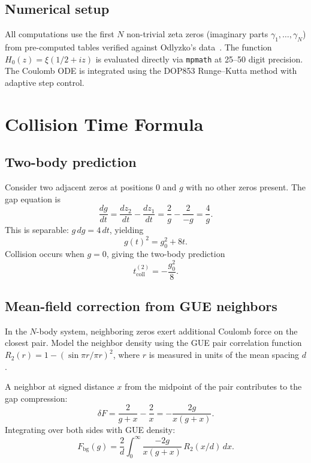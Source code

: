 \documentclass[11pt,a4paper]{article}
\begin{document}
\subsection{Numerical setup}

All computations use the first $N$ non-trivial zeta zeros (imaginary
parts $\gamma_1, \ldots, \gamma_N$) from pre-computed tables verified
against Odlyzko's data~\cite{odlyzko}. The function $H_0(z) =
\xi(1/2+iz)$ is evaluated directly via \texttt{mpmath} at 25--50
digit precision. The Coulomb ODE is integrated using the DOP853
Runge--Kutta method with adaptive step control.

\section{Collision Time Formula}\label{sec:collision}

\subsection{Two-body prediction}

Consider two adjacent zeros at positions $0$ and $g$ with no other
zeros present. The gap equation is
\[
  \frac{dg}{dt} = \frac{dz_2}{dt} - \frac{dz_1}{dt}
  = \frac{2}{g} - \frac{2}{-g} = \frac{4}{g}.
\]
This is separable: $g\,dg = 4\,dt$, yielding
\begin{equation}\label{eq:2body}
  g(t)^2 = g_0^2 + 8t.
\end{equation}
Collision occurs when $g = 0$, giving the two-body prediction
\begin{equation}\label{eq:t-2body}
  t_{\mathrm{coll}}^{(2)} = -\frac{g_0^2}{8}.
\end{equation}

\subsection{Mean-field correction from GUE neighbors}

In the $N$-body system, neighboring zeros exert additional Coulomb
force on the closest pair. Model the neighbor density using the GUE
pair correlation function $R_2(r) = 1 - (\sin\pi r / \pi r)^2$,
where $r$ is measured in units of the mean spacing $d$.

A neighbor at signed distance $x$ from the midpoint of the pair
contributes to the gap compression:
\[
  \delta F = \frac{2}{g + x} - \frac{2}{x} = -\frac{2g}{x(g+x)}.
\]
Integrating over both sides with GUE density:
\begin{equation}\label{eq:Fbg}
  F_{\mathrm{bg}}(g) = \frac{2}{d}\int_0^\infty
    \frac{-2g}{x(g+x)}\,R_2(x/d)\,dx.
\end{equation}
\end{document}

